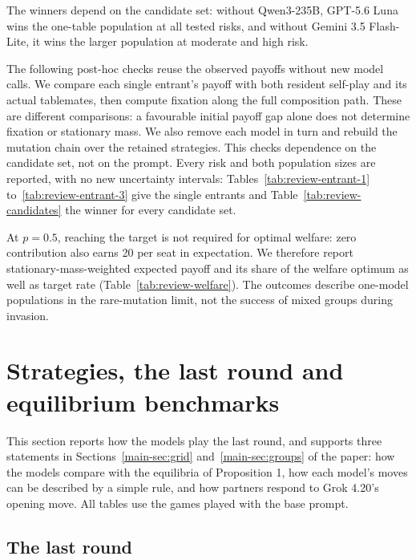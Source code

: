 \documentclass[10pt]{article}
\let\plainsubsection\subsection
\renewcommand{\subsection}{\FloatBarrier\needspace{8\baselineskip}\plainsubsection}
\let\plainsection\section
\renewcommand{\section}{\FloatBarrier\needspace{12\baselineskip}\plainsection}  %
\begin{document}
The winners depend on the candidate set: without Qwen3-235B, GPT-5.6 Luna wins the one-table population at all tested risks, and without Gemini 3.5 Flash-Lite, it wins the larger population at moderate and high risk.

The following post-hoc checks reuse the observed payoffs without new model calls. We compare each single entrant's payoff with both resident self-play and its actual tablemates, then compute fixation along the full composition path. These are different comparisons: a favourable initial payoff gap alone does not determine fixation or stationary mass. We also remove each model in turn and rebuild the mutation chain over the retained strategies. This checks dependence on the candidate set, not on the prompt. Every risk and both population sizes are reported, with no new uncertainty intervals: Tables~\ref{tab:review-entrant-1} to~\ref{tab:review-entrant-3} give the single entrants and Table~\ref{tab:review-candidates} the winner for every candidate set.

At $p=0.5$, reaching the target is not required for optimal welfare: zero contribution also earns 20 per seat in expectation. We therefore report stationary-mass-weighted expected payoff and its share of the welfare optimum as well as target rate (Table~\ref{tab:review-welfare}). The outcomes describe one-model populations in the rare-mutation limit, not the success of mixed groups during invasion.



\section{Strategies, the last round and equilibrium benchmarks}
\label{sec:strategy}

This section reports how the models play the last round, and supports three statements in Sections~\ref{main-sec:grid} and~\ref{main-sec:groups} of the paper: how the models compare with the equilibria of Proposition 1, how each model's moves can be described by a simple rule, and how partners respond to Grok 4.20's opening move. All tables use the games played with the base prompt.

\subsection{The last round}
\label{sec:last-round}
\end{document}
